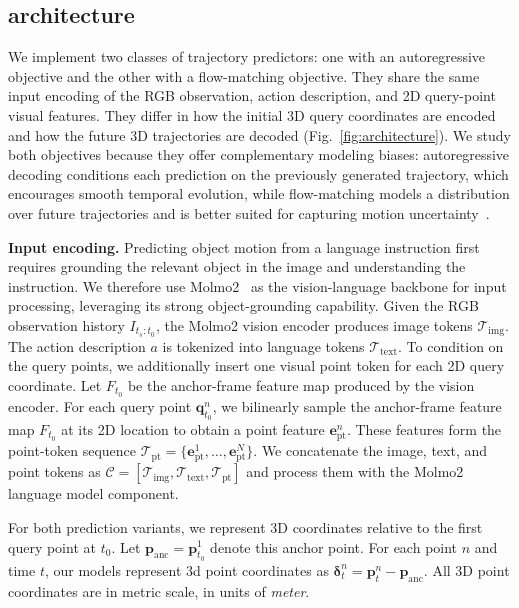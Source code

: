 \subsection{\modelname architecture}
\label{subsec:model}



We implement two classes of trajectory predictors: one with an autoregressive objective and the other with a flow-matching objective. They share the same input encoding of the RGB observation, action description, and 2D query-point visual features.
They differ in how the initial 3D query coordinates are encoded and how the future 3D trajectories are decoded (Fig.~\ref{fig:architecture}).
We study both objectives because they offer complementary modeling biases: autoregressive decoding conditions each prediction on the previously generated trajectory, which encourages smooth temporal evolution, while flow-matching models a distribution over future trajectories and is better suited for capturing motion uncertainty~\cite{chi2024diffusionpolicyvisuomotorpolicy}.

\noindent\textbf{Input encoding.}
Predicting object motion from a language instruction first requires grounding the relevant object in the image and understanding the instruction. We therefore use Molmo2~\cite{clark2026molmo2} as the vision-language backbone for input processing, leveraging its strong object-grounding capability. 
Given the RGB observation history $I_{t_s:t_0}$, the Molmo2 vision encoder produces image tokens $\mathcal{T}_{\mathrm{img}}$. The action description $a$ is tokenized into language tokens $\mathcal{T}_{\mathrm{text}}$. To condition on the query points, we additionally insert one visual point token for each 2D query coordinate. Let $F_{t_0}$ be the anchor-frame feature map produced by the vision encoder. 
For each query point $\mathbf{q}_{t_0}^{n}$, we bilinearly sample the anchor-frame feature map $F_{t_0}$ at its 2D location to obtain a point feature $\mathbf{e}_{\mathrm{pt}}^{n}$.
These features form the point-token sequence
$\mathcal{T}_{\mathrm{pt}}=\{\mathbf{e}_{\mathrm{pt}}^{1},\ldots,\mathbf{e}_{\mathrm{pt}}^{N}\}$.
We concatenate the image, text, and point tokens as
$\mathcal{C}=[\mathcal{T}_{\mathrm{img}},\mathcal{T}_{\mathrm{text}},\mathcal{T}_{\mathrm{pt}}]$
and process them with the Molmo2 language model component.

For both prediction variants, we represent 3D coordinates relative to the first query point at $t_0$. Let $\mathbf{p}_{\mathrm{anc}}=\mathbf{p}_{t_0}^{1}$ denote this anchor point. For each point $n$ and time $t$, our models represent 3d point coordinates as
$\boldsymbol{\delta}_{t}^{n}
=
\mathbf{p}_{t}^{n}-\mathbf{p}_{\mathrm{anc}}$.
All 3D point coordinates are in metric scale, in units of \textit{meter}.

